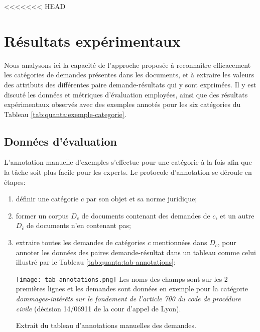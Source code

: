 <<<<<<< HEAD

\section{Résultats expérimentaux}

Nous analysons ici la capacité de l'approche proposée à reconnaître efficacement les catégories de demandes présentes dans les documents, et à extraire les valeurs des attributs des différentes paire demande-résultats qui y sont exprimées.  Il y est discuté les données et métriques d'évaluation employées, ainsi que des résultats expérimentaux observés avec des exemples annotés pour les six catégories du Tableau \ref{tab:quanta:exemple-categorie}. 

\subsection{Données d'évaluation}
L'annotation manuelle d'exemples s'effectue pour une catégorie à la fois afin que la tâche soit plus facile pour les experts. Le protocole d'annotation se déroule en étapes: 
\begin{enumerate}
	\item définir une catégorie $c$ par son objet et sa norme juridique;
	\item former un corpus $D_c$ de documents contenant des demandes de $c$, et un autre $D_{\overline{c}}$ de documents n'en contenant pas; 
	\item extraire toutes les demandes de catégories $c$ mentionnées dans $D_c$, pour annoter les données des paires demande-résultat dans un tableau comme celui illustré par le  Tableau \ref{tab:quanta:tab-annotations};
	
	\begin{table}[!htb]
		\texttt{[image: tab-annotations.png]}
		\scriptsize{Les noms des champs sont sur les 2 premières lignes et les demandes sont données en exemple pour la catégorie \textit{dommages-intérêts sur le fondement de l'article 700 du code de procédure civile} (décision 14/06911 de la cour d'appel de Lyon).}
		\caption{Extrait du tableau d'annotations manuelles des demandes.} \label{tab:quanta:tab-annotations}
	\end{table}
\end{enumerate}


